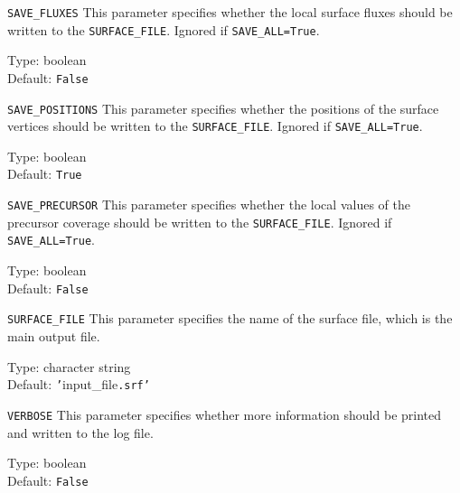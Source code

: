 \begin{keydescription}{\texttt{SAVE\_FLUXES}}
This parameter specifies whether the local surface fluxes should be written to
the \texttt{SURFACE\_FILE}. Ignored if \texttt{SAVE\_ALL=True}.
\begin{keytab}
   Type:    \> boolean \\
   Default: \> \texttt{False}
\end{keytab}
\end{keydescription}

\begin{keydescription}{\texttt{SAVE\_POSITIONS}}
This parameter specifies whether the positions of the surface vertices
should be written to the \texttt{SURFACE\_FILE}. Ignored if
\texttt{SAVE\_ALL=True}.
\begin{keytab}
   Type:    \> boolean \\
   Default: \> \texttt{True}
\end{keytab}
\end{keydescription}

\begin{keydescription}{\texttt{SAVE\_PRECURSOR}}
This parameter specifies whether the local values of the precursor coverage
should be written to the \texttt{SURFACE\_FILE}. Ignored if
\texttt{SAVE\_ALL=True}. 
\begin{keytab}
   Type:    \> boolean \\
   Default: \> \texttt{False}
\end{keytab}
\end{keydescription}

\begin{keydescription}{\texttt{SURFACE\_FILE}}
This parameter specifies the name of the surface file, which is the main output
file.
\begin{keytab}
   Type:    \> character string \\
   Default: \> \texttt{'}input\_file\texttt{.srf'}
\end{keytab}
\end{keydescription}

\begin{keydescription}{\texttt{VERBOSE}}
This parameter specifies whether more information should be printed and
written to the log file.
\begin{keytab}
   Type:    \> boolean \\
   Default: \> \texttt{False}
\end{keytab}
\end{keydescription}

